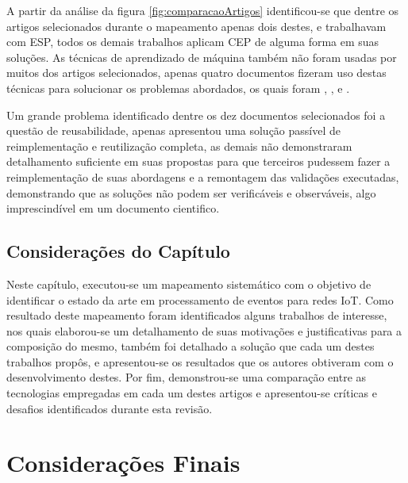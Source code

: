 \documentclass[ti,table]{texufpel} %
\begin{document}
  

  

A partir da análise da figura \ref{fig:comparacaoArtigos} identificou-se que dentre os artigos selecionados durante o mapeamento apenas dois destes, \cite{art1aslam2018towards} e \cite{art5chen2016dress} trabalhavam com ESP, todos os demais trabalhos aplicam CEP de alguma forma em suas soluções. As técnicas de aprendizado de máquina também não foram usadas por muitos dos artigos selecionados, apenas quatro documentos fizeram uso destas técnicas para solucionar os problemas abordados, os quais foram \cite{art1aslam2018towards}, \cite{art4akbar2017predictive}, \cite{art9kousiouris2018integrated} e \cite{art10soto2016ceml}.  

  

Um grande problema identificado dentre os dez documentos selecionados foi a questão de reusabilidade, apenas \cite{art2zimmerle2018web} apresentou uma solução passível de reimplementação e reutilização completa, as demais não demonstraram detalhamento suficiente em suas propostas para que terceiros pudessem  fazer a reimplementação de suas abordagens e a remontagem das validações executadas, demonstrando que as soluções não podem ser verificáveis e observáveis, algo imprescindível em um documento cientifico.  

  

\section{Considerações do Capítulo} 

  

Neste capítulo, executou-se um mapeamento sistemático com o objetivo de identificar o estado da arte em processamento de eventos para redes IoT. Como resultado deste mapeamento foram identificados alguns trabalhos de interesse, nos quais elaborou-se um detalhamento de suas motivações e justificativas para a composição do mesmo, também foi detalhado a solução que cada um destes trabalhos propôs, e apresentou-se os resultados que os autores obtiveram com o desenvolvimento destes. Por fim, demonstrou-se uma comparação entre as tecnologias empregadas em cada um destes artigos e apresentou-se críticas e desafios identificados durante esta revisão.  

  


  

\chapter{Considerações Finais} 
\end{document}
